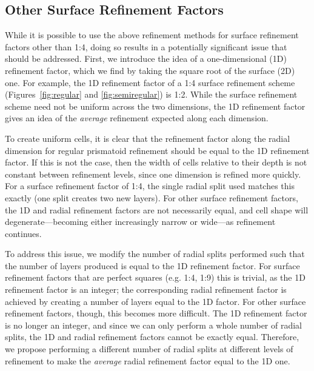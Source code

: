 \subsection{Other Surface Refinement Factors} \label{chap:5:factors}
While it is possible to use the above refinement methods for surface refinement factors other than 1:4, doing so results in a potentially significant issue that should be addressed.
First, we introduce the idea of a one-dimensional (1D) refinement factor, which we find by taking the square root of the surface (2D) one.
For example, the 1D refinement factor of a 1:4 surface refinement scheme (Figures~\ref{fig:regular} and \ref{fig:semiregular}) is 1:2.
While the surface refinement scheme need not be uniform across the two dimensions, the 1D refinement factor gives an idea of the \textit{average} refinement expected along each dimension.


To create uniform cells, it is clear that the refinement factor along the radial dimension for regular prismatoid refinement should be equal to the 1D refinement factor.
If this is not the case, then the width of cells relative to their depth is not constant between refinement levels, since one dimension is refined more quickly.
For a surface refinement factor of 1:4, the single radial split used matches this exactly (one split creates two new layers).
For other surface refinement factors, the 1D and radial refinement factors are not necessarily equal, and cell shape will degenerate---becoming either increasingly narrow or wide---as refinement continues.


To address this issue, we modify the number of radial splits performed such that the number of layers produced is equal to the 1D refinement factor.
For surface refinement factors that are perfect squares (e.g.
1:4, 1:9) this is trivial, as the 1D refinement factor is an integer; the corresponding radial refinement factor is achieved by creating a number of layers equal to the 1D factor.
For other surface refinement factors, though, this becomes more difficult.
The 1D refinement factor is no longer an integer, and since we can only perform a whole number of radial splits, the 1D and radial refinement factors cannot be exactly equal.
Therefore, we propose performing a different number of radial splits at different levels of refinement to make the \textit{average} radial refinement factor equal to the 1D one.


